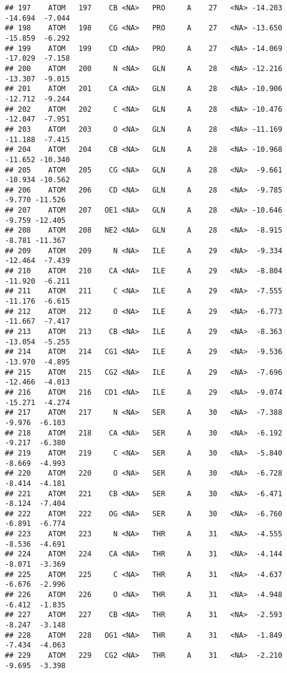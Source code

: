 \documentclass[
]{article}
\begin{document}
\begin{verbatim}
## 197    ATOM   197    CB <NA>   PRO     A    27   <NA> -14.203 -14.694  -7.044
## 198    ATOM   198    CG <NA>   PRO     A    27   <NA> -13.650 -15.859  -6.292
## 199    ATOM   199    CD <NA>   PRO     A    27   <NA> -14.069 -17.029  -7.158
## 200    ATOM   200     N <NA>   GLN     A    28   <NA> -12.216 -13.307  -9.015
## 201    ATOM   201    CA <NA>   GLN     A    28   <NA> -10.906 -12.712  -9.244
## 202    ATOM   202     C <NA>   GLN     A    28   <NA> -10.476 -12.047  -7.951
## 203    ATOM   203     O <NA>   GLN     A    28   <NA> -11.169 -11.188  -7.415
## 204    ATOM   204    CB <NA>   GLN     A    28   <NA> -10.968 -11.652 -10.340
## 205    ATOM   205    CG <NA>   GLN     A    28   <NA>  -9.661 -10.934 -10.562
## 206    ATOM   206    CD <NA>   GLN     A    28   <NA>  -9.785  -9.770 -11.526
## 207    ATOM   207   OE1 <NA>   GLN     A    28   <NA> -10.646  -9.759 -12.405
## 208    ATOM   208   NE2 <NA>   GLN     A    28   <NA>  -8.915  -8.781 -11.367
## 209    ATOM   209     N <NA>   ILE     A    29   <NA>  -9.334 -12.464  -7.439
## 210    ATOM   210    CA <NA>   ILE     A    29   <NA>  -8.804 -11.920  -6.211
## 211    ATOM   211     C <NA>   ILE     A    29   <NA>  -7.555 -11.176  -6.615
## 212    ATOM   212     O <NA>   ILE     A    29   <NA>  -6.773 -11.667  -7.417
## 213    ATOM   213    CB <NA>   ILE     A    29   <NA>  -8.363 -13.054  -5.255
## 214    ATOM   214   CG1 <NA>   ILE     A    29   <NA>  -9.536 -13.970  -4.895
## 215    ATOM   215   CG2 <NA>   ILE     A    29   <NA>  -7.696 -12.466  -4.013
## 216    ATOM   216   CD1 <NA>   ILE     A    29   <NA>  -9.074 -15.271  -4.274
## 217    ATOM   217     N <NA>   SER     A    30   <NA>  -7.388  -9.976  -6.103
## 218    ATOM   218    CA <NA>   SER     A    30   <NA>  -6.192  -9.217  -6.380
## 219    ATOM   219     C <NA>   SER     A    30   <NA>  -5.840  -8.669  -4.993
## 220    ATOM   220     O <NA>   SER     A    30   <NA>  -6.728  -8.414  -4.181
## 221    ATOM   221    CB <NA>   SER     A    30   <NA>  -6.471  -8.124  -7.404
## 222    ATOM   222    OG <NA>   SER     A    30   <NA>  -6.760  -6.891  -6.774
## 223    ATOM   223     N <NA>   THR     A    31   <NA>  -4.555  -8.536  -4.691
## 224    ATOM   224    CA <NA>   THR     A    31   <NA>  -4.144  -8.071  -3.369
## 225    ATOM   225     C <NA>   THR     A    31   <NA>  -4.637  -6.676  -2.996
## 226    ATOM   226     O <NA>   THR     A    31   <NA>  -4.948  -6.412  -1.835
## 227    ATOM   227    CB <NA>   THR     A    31   <NA>  -2.593  -8.247  -3.148
## 228    ATOM   228   OG1 <NA>   THR     A    31   <NA>  -1.849  -7.434  -4.063
## 229    ATOM   229   CG2 <NA>   THR     A    31   <NA>  -2.210  -9.695  -3.398

\end{verbatim}
\end{document}
